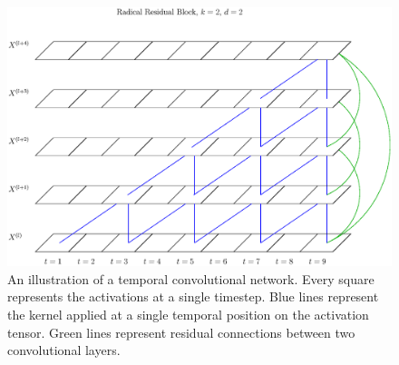 \documentclass[a4paper, twoside]{article}
\begin{document}
\begin{figure}%
\begin{center}
    \includegraphics[width=14cm]{figRadical.eps}\caption{An illustration of a temporal convolutional network. Every square represents the activations at a single timestep. Blue lines represent the kernel applied at a single temporal position on the activation tensor. Green lines represent residual connections between two convolutional layers.}\label{figTCNRadical}
\end{center}
\end{figure}
\end{document}
